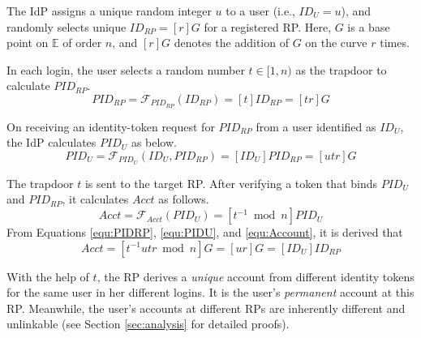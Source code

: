 The IdP assigns a unique random integer $u$ to a user (i.e., $ID_U = u$),
 and randomly selects unique $ID_{RP} = [r]G$ for a registered RP. %
Here, $G$ is a base point on $\mathbb{E}$ of order $n$, and $[r]G$ denotes the addition of $G$ on the curve $r$ times.


 In each login, the user selects a random number $t \in [1, n)$ as the trapdoor to calculate $PID_{RP}$.
\begin{equation}
PID_{RP} = \mathcal{F}_{PID_{RP}}(ID_{RP}) = [t]{ID_{RP}} = [tr]G
\label{equ:PIDRP}
\end{equation}



On receiving an identity-token request for $PID_{RP}$ from a user identified as $ID_U$, the IdP calculates $PID_{U}$ as below.
\begin{equation}
PID_{U} = \mathcal{F}_{PID_U}(ID_U, PID_{RP}) =
  [{ID_U}]{PID_{RP}} = [utr]G
 \label{equ:PIDU}
\end{equation}


The trapdoor $t$ is sent to the target RP. %
After verifying a token that binds $PID_U$ and $PID_{RP}$, it calculates $Acct$ as follows.
\begin{equation}
Acct = \mathcal{F}_{Acct}(PID_{U})
   = [t^{-1} \bmod n]PID_{U}
   \label{equ:Account}
\end{equation}
From Equations \ref{equ:PIDRP}, \ref{equ:PIDU}, and \ref{equ:Account}, it is derived that
\begin{equation}
   Acct =  [t^{-1}utr \bmod n]G = [ur]G = [ID_U]ID_{RP}
   \label{equ:AccountNotChanged}
\end{equation}


With the help of $t$, the RP derives a \emph{unique} account from different identity tokens for the same user in her different logins. It is the user's \emph{permanent} account at this RP. %
Meanwhile, the user's accounts at different RPs are inherently different and unlinkable (see Section \ref{sec:analysis} for detailed proofs).

